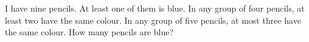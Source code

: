 I have nine pencils. At least one of them is blue. In any group of four pencils, at least two have the same colour. In any group of five pencils, at most three have the same colour. How many pencils are blue?
